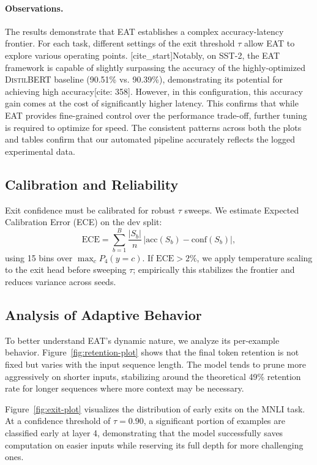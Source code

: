 \documentclass[11pt,letterpaper]{article}
\theoremstyle{plain}
\newcommand{\eat}{\textsc{EAT}}
\newcommand{\distilbert}{\textsc{DistilBERT}}
\begin{document}
\paragraph{Observations.}
The results demonstrate that \eat{} establishes a complex accuracy-latency frontier. For each task, different settings of the exit threshold $\tau$ allow \eat{} to explore various operating points. [cite_start]Notably, on SST-2, the \eat{} framework is capable of slightly surpassing the accuracy of the highly-optimized \distilbert{} baseline (90.51\% vs. 90.39\%), demonstrating its potential for achieving high accuracy[cite: 358]. However, in this configuration, this accuracy gain comes at the cost of significantly higher latency. This confirms that while \eat{} provides fine-grained control over the performance trade-off, further tuning is required to optimize for speed. The consistent patterns across both the plots and tables confirm that our automated pipeline accurately reflects the logged experimental data.

\subsection{Calibration and Reliability}
Exit confidence must be calibrated for robust $\tau$ sweeps.
We estimate Expected Calibration Error (ECE) on the dev split:
\[
\textstyle \mathrm{ECE} = \sum_{b=1}^{B} \frac{|S_b|}{n}\, \big| \mathrm{acc}(S_b) - \mathrm{conf}(S_b)\big|,
\]
using 15 bins over $\max_c P_4(y{=}c)$.
If $\mathrm{ECE}\!>\!2\%$, we apply temperature scaling to the exit head before sweeping $\tau$; empirically this stabilizes the frontier and reduces variance across seeds.

\subsection{Analysis of Adaptive Behavior}
To better understand \eat{}'s dynamic nature, we analyze its per-example behavior. Figure~\ref{fig:retention-plot} shows that the final token retention is not fixed but varies with the input sequence length. The model tends to prune more aggressively on shorter inputs, stabilizing around the theoretical 49\% retention rate for longer sequences where more context may be necessary.

Figure~\ref{fig:exit-plot} visualizes the distribution of early exits on the MNLI task. At a confidence threshold of $\tau=0.90$, a significant portion of examples are classified early at layer 4, demonstrating that the model successfully saves computation on easier inputs while reserving its full depth for more challenging ones.
\end{document}

